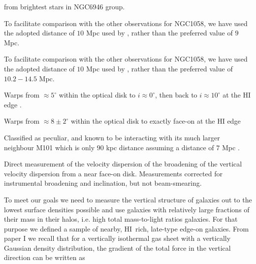\documentclass[traditabstract]{aa} %
\newcommand\HI{H{\small I}}
\begin{document}
\begin{table}[t]
\begin{footnotesize}
\begin{list}{}{}
from brightest
    stars in NGC6946 group.
\item[$^{\mathrm{c}}$] To facilitate comparison with the other observations for
    NGC1058, we have used the adopted distance
    of $10$ Mpc used by \citet{pr2006}, rather than
    the \citet{vdks1984} preferred value of $9$ Mpc.
\item[$^{\mathrm{d}}$] To facilitate comparison with the other observations for
    NGC1058, we have used the adopted distance
    of $10$ Mpc used by \citet{pr2006}, rather than
    the \citet{dhh1990} preferred value of $10.2-14.5$ Mpc.
\item[$^{\mathrm{e}}$] Warps from $\approx5^{\circ}$ within the optical disk to
    $i\approx0^{\circ}$, then back to $i\approx10^{\circ}$ at the 
H{\scriptsize I}
    edge \citep{svdk1984}.
\item[$^{\mathrm{f}}$] Warps from $\approx8\pm2^{\circ}$ within the optical 
disk to
    exactly face-on at the H{\scriptsize I} edge \citep{vdks1984}
\item[$^{\mathrm{g}}$] Classified as peculiar, and known to be interacting 
with its
    much larger neighbour M101 which is only $90$ kpc distance
    assuming a distance of $7$ Mpc \citep{rdh1994}.
\item[$^{\mathrm{h}}$] Direct measurement of the velocity dispersion of the
    broadening of the vertical velocity dispersion from a near face-on
    disk. Measurements corrected for instrumental broadening and
    inclination, but not beam-smearing.
\end{list}
\end{footnotesize}
\end{table}



To meet our goals we need to measure the vertical structure of galaxies
out to the lowest surface densities possible and use galaxies with
relatively large fractions of their mass in their halos, i.e. high total 
mass-to-light ratios galaxies. For that purpose
we defined a sample of nearby, \HI\ rich, late-type edge-on galaxies.
From paper I we recall that for a vertically isothermal gas sheet 
with a vertically Gaussian density distribution, the gradient of 
the total force in the vertical direction can be 
written as
\end{document}
